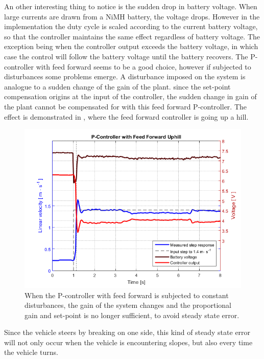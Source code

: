 An other interesting thing to notice is the sudden drop in battery voltage. When large currents are drawn from a NiMH battery, the voltage drops\cite{BatteryDS}. However in the implementation the duty cycle is scaled according to the current battery voltage, so that the controller maintains the same effect regardless of battery voltage. The exception being when the controller output exceeds the battery voltage, in which case the control will follow the battery voltage until the battery recovers.
%
The P-controller with feed forward seems to be a good choice, however if subjected to disturbances some problems emerge. A disturbance imposed on the system is analogue to a sudden change of the gain of the plant. since the set-point compensation origins at the input of the controller, the sudden change in gain of the plant cannot be compensated for with this feed forward P-controller.
%
The effect is demonstrated in , where the feed forward controller is going up a hill.
%
\begin{figure}[H]
 	\centering
 	\includegraphics[width=.9\textwidth]{figures/hillPfeedForward}
 	\caption{When the P-controller with feed forward is subjected to constant disturbances, the gain of the system changes and the proportional gain and set-point is no longer sufficient, to avoid steady state error.}
 	\label{fig:hillPfeedForward}
\end{figure}\vspace{-5mm}
%
Since the vehicle steers by breaking on one side, this kind of steady state error will not only occur when the vehicle is encountering slopes, but also every time the vehicle turns.
%
